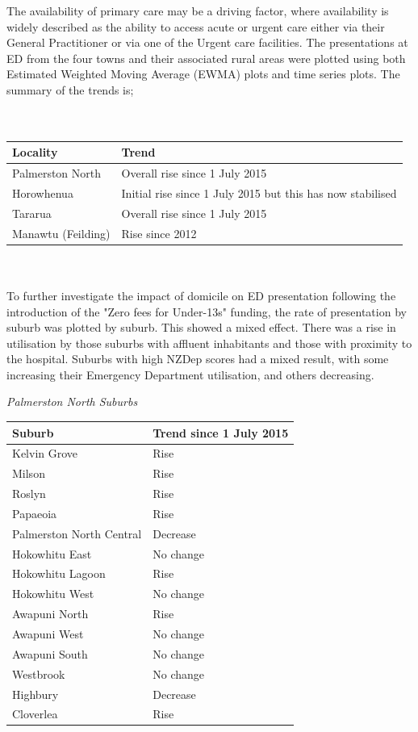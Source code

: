 \documentclass[11pt,a4paper]{article}
\begin{document}
The availability of primary care may be a driving factor, where availability is widely described as the ability to access acute or urgent care either via their General Practitioner or via one of the Urgent care facilities. The presentations at ED from the four towns and their associated rural areas were plotted using both Estimated Weighted Moving Average (EWMA) plots and time series plots. The summary of the trends is;\\ 
\\
\\
\begin{tabular}{|l|l|}
\hline 
        Locality & Trend\\
\hline
        Palmerston North & Overall rise since 1 July 2015\\
\hline
        Horowhenua & Initial rise since  1 July 2015 but this has now stabilised\\
\hline
        Tararua & Overall rise since 1 July 2015\\
\hline
        Manawtu (Feilding) & Rise since 2012\\
\hline
\end{tabular}
\\
\\
To further investigate the impact of domicile on ED presentation following the introduction of the "Zero fees for Under-13s" funding, the rate of presentation by suburb was plotted by suburb. This showed a mixed effect. There was a rise in utilisation by those suburbs with affluent inhabitants and those with proximity to the hospital. Suburbs with high NZDep scores had a mixed result, with some increasing their Emergency Department utilisation, and others decreasing.
\pagebreak


\emph{Palmerston North Suburbs}


\begin{tabular}{|l|l|}
\hline
        Suburb & Trend since 1 July 2015\\
\hline
        Kelvin Grove & Rise\\
\hline
        Milson & Rise\\
\hline
        Roslyn & Rise\\
\hline
        Papaeoia & Rise\\
\hline
        Palmerston North Central & Decrease\\
\hline
        Hokowhitu East & No change\\
\hline
        Hokowhitu Lagoon & Rise\\
\hline
        Hokowhitu West & No change\\
\hline
        Awapuni North & Rise\\
\hline
        Awapuni West & No change\\
\hline
        Awapuni South & No change\\
\hline
        Westbrook & No change\\
\hline
        Highbury & Decrease\\
\hline
        Cloverlea & Rise\\
\hline
\end{tabular}
\\
\\
\end{document}
